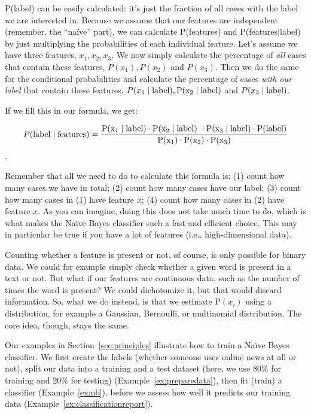 P(label) can be easily calculated: it's just the fraction of all
cases with the label we are interested in.  Because we assume that our
features are independent (remember, the ``na\"ive'' part), we can
calculate P(features) and P(features$\mid$label) by just
multiplying the probabilities of each individual feature.  Let's
assume we have three features, $x_1, x_2, x_3$.  We now simply
calculate the percentage of \emph{all} cases that contain these
features, ${P}(x_1), {P}(x_2)$ and ${P}(x_3)$.  Then we do the same for the
conditional probabilities and calculate the percentage of cases
\emph{with our label} that contain these features, ${P}(x_1\mid \rm{label}),
{P}(x_2\mid \rm{label})$ and ${P}(x_3\mid \rm{label})$.

If we fill this in our formula, we get:


$$ P(\rm{label} \mid \rm{features}) = \frac{P(x_1 \mid label) \cdot P(x_2 \mid \rm{label})\ \cdot P(x_3 \mid label) \cdot P(label)}{P(x_1) \cdot P(x_2) \cdot P(x_3)}$$.

Remember that all we need to do to calculate this formula is: (1)
count how many cases we have in total; (2) count how many cases
have our label; (3) count how many cases in (1) have feature $x$;
(4) count  how many cases in (2) have feature $x$.  As you can
imagine, doing this does not take much time to do, which is what makes the
Na\"ive Bayes classifier such a fast and efficient choice.  This may
in particular be true if you have a lot of features (i.e.,
high-dimensional data).

Counting whether a feature is present or not, of course, is only
possible for binary data. We could for example simply check whether a
given word is present in a text or not.  But what if our features are
continuous data, such as the number of times the word is present?  We
could dichotomize it, but that would discard information.  So, what
we do instead, is that we estimate P$(x_i)$ using a distribution, for
example a Gaussian, Bernoulli, or multinomial distribution. The core
idea, though, stays the same.

Our examples in Section~\ref{sec:principles} illustrate how to train a Na\"ive Bayes classifier.
We first create the labels (whether someone uses online news at all or
not), split our data into a training and a test dataset (here, we use
80\% for training and 20\% for testing) (Example~\ref{ex:preparedata}), then
fit (train) a classifier (Example~\ref{ex:nb}), before we assess how well it
predicts our training data (Example~\ref{ex:classificationreport}).

